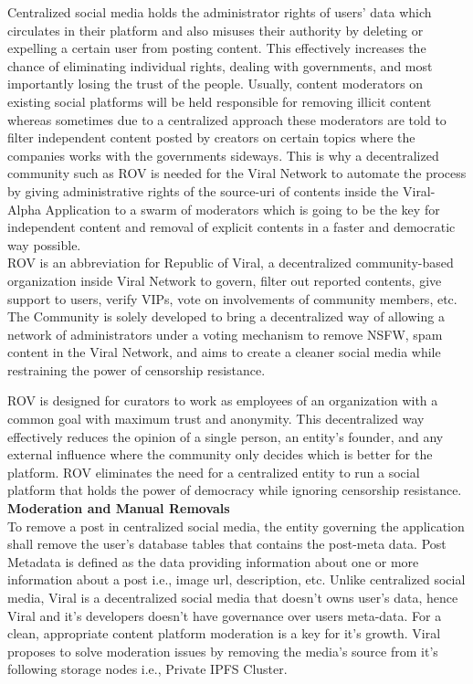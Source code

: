 \documentclass[10pt]{article}
\begin{document}
Centralized social media holds the administrator rights of users’ data which circulates in their platform and also misuses their authority by deleting or expelling a certain user from posting content. This effectively increases the chance of eliminating individual rights, dealing with governments, and most importantly losing the trust of the people. Usually, content moderators on existing social platforms will be held responsible for removing illicit content whereas sometimes due to a centralized approach these moderators are told to filter independent content posted by creators on certain topics where the companies works with the governments sideways. This is why a decentralized community such as ROV is needed for the Viral Network to automate the process by giving administrative rights of the source-uri of contents inside the Viral-Alpha Application to a swarm of moderators which is going to be the key for independent content and removal of explicit contents in a faster and democratic way possible.\\

ROV is an abbreviation for Republic of Viral, a decentralized community-based organization inside Viral Network to govern, filter out reported contents, give support to users, verify VIPs, vote on involvements of community members, etc. The Community is solely developed to bring a decentralized way of allowing a network of administrators under a voting mechanism to remove NSFW, spam content in the Viral Network, and aims to create a cleaner social media while restraining the power of censorship resistance. 

ROV is designed for curators to work as employees of an organization with a common goal with maximum trust and anonymity. This decentralized way effectively reduces the opinion of a single person, an entity’s founder, and any external influence where the community only decides which is better for the platform. ROV eliminates the need for a centralized entity to run a social platform that holds the power of democracy while ignoring censorship resistance. \\

\textbf{Moderation and Manual Removals}\\

To remove a post in centralized social media, the entity governing the application shall remove the user's database tables that contains the post-meta data. Post Metadata is defined as the data providing information about one or more information about a post i.e., image url, description, etc. Unlike centralized social media, Viral is a decentralized social media that doesn't owns user's data, hence Viral and it's developers doesn't have governance over users meta-data. For a clean, appropriate content platform moderation is a key for it's growth. Viral proposes to solve moderation issues by removing the media's source from it's following storage nodes i.e., Private IPFS Cluster.\\
\end{document}
